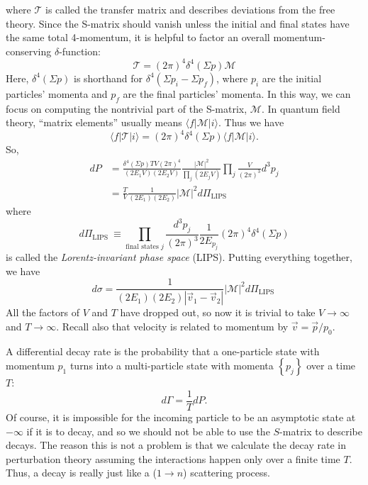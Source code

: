 where $\mathcal{T}$ is called the transfer matrix and describes deviations from the free theory. 
Since the S-matrix should vanish unless the initial and final states have the same total 4-momentum, it is helpful to factor an overall momentum-conserving $\delta$-function:
\begin{equation}
	\mathcal{T}=(2 \pi)^{4} \delta^{4}(\Sigma p) \mathcal{M}
\end{equation}
Here, $\delta^{4}(\Sigma p)$ is shorthand for $\delta^{4}\left(\Sigma p_{i}-\Sigma p_{f}\right)$, where $p_{i}$ are the initial particles' momenta and $p_{f}$ are the final particles' momenta. 
In this way, we can focus on computing the nontrivial part of the S-matrix, $\mathcal{M}$. 
In quantum field theory, ``matrix elements'' usually means $\langle f|\mathcal{M}| i\rangle$. Thus we have
\begin{equation}
	\langle f|\mathcal T| i\rangle=(2 \pi)^{4} \delta^{4}(\Sigma p)\langle f|\mathcal{M}| i\rangle.
\end{equation}
So,
\begin{equation}
\begin{aligned}
	d P &=\frac{\delta^{4}(\Sigma p) T V(2 \pi)^{4}}{\left(2 E_{1} V\right)\left(2 E_{2} V\right)} \frac{|\mathcal{M}|^{2}}{\prod_{j}\left(2 E_{j} V\right)} \prod_{j} \frac{V}{(2 \pi)^{3}} d^{3} p_{j} \\
	&=\frac{T}{V} \frac{1}{\left(2 E_{1}\right)\left(2 E_{2}\right)}|\mathcal{M}|^{2} d \Pi_{\mathrm{LIPS}}
\end{aligned}
\end{equation}
where
\begin{equation}
	d \Pi_{\text {LIPS }} \equiv \prod_{\text {final states } j} \frac{d^{3} p_{j}}{(2 \pi)^{3}} \frac{1}{2 E_{p_{j}}}(2 \pi)^{4} \delta^{4}(\Sigma p)
\end{equation}
is called the \textit{Lorentz-invariant phase space} (LIPS).
Putting everything together, we have
\begin{equation}
	d \sigma=\frac{1}{\left(2 E_{1}\right)\left(2 E_{2}\right)\left|\vec{v}_{1}-\vec{v}_{2}\right|}|\mathcal{M}|^{2} d \Pi_{\text {LIPS }}
\end{equation}
All the factors of $V$ and $T$ have dropped out, so now it is trivial to take $V \rightarrow \infty$ and $T \rightarrow \infty$. Recall also that velocity is related to momentum by $\vec{v}=\vec{p} / p_{0}$.

A differential decay rate is the probability that a one-particle state with momentum $p_{1}$ turns into a multi-particle state with momenta $\left\{p_{j}\right\}$ over a time $T$:
\begin{equation}
	d \Gamma=\frac{1}{T} d P .
\end{equation}
Of course, it is impossible for the incoming particle to be an asymptotic state at $-\infty$ if it is to decay, and so we should not be able to use the $S$-matrix to describe decays. 
The reason this is not a problem is that we calculate the decay rate in perturbation theory assuming the interactions happen only over a finite time $T$. 
Thus, a decay is really just like a ($1 \rightarrow n$) scattering process.

